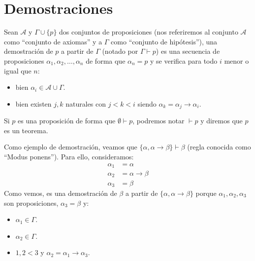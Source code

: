 
\section{Demostraciones}
\begin{definicion}[Demostración]
    Sean $\mathcal{A}$ y $\Gamma\cup\{p\}$ dos conjuntos de proposiciones (nos referiremos al conjunto $\mathcal{A}$ como ``conjunto de axiomas'' y a $\Gamma$ como ``conjunto de hipótesis''), una demostración de $p$ a partir de $\Gamma$ (notado por $\Gamma\vdash p$) es una secuencia de proposiciones $\alpha_1,\alpha_2,\ldots,\alpha_n$ de forma que $\alpha_n=p$ y se verifica para todo $i$ menor o igual que $n$:
    \begin{itemize}
        \item bien $\alpha_i \in \mathcal{A}\cup\Gamma$.
        \item bien existen $j,k$ naturales con $j<k<i$ siendo $\alpha_k = \alpha_j\to \alpha_i$.
    \end{itemize}
\end{definicion}

\begin{notacion}
    Si $p$ es una proposición de forma que $\emptyset \vdash p$, podremos notar $\vdash p$ y diremos que $p$ es un teorema.
\end{notacion}

\begin{ejemplo}
    Como ejemplo de demostración, veamos que $\{\alpha,\alpha\to\beta\}\vdash \beta$ (regla conocida como ``Modus ponens''). Para ello, consideramos:
    \begin{align*}
        \alpha_1 &= \alpha \\
        \alpha_2 &= \alpha\to\beta \\
        \alpha_3 &= \beta
    \end{align*}
    Como vemos, es una demostración de $\beta$ a partir de $\{\alpha,\alpha\to\beta\}$ porque $\alpha_1,\alpha_2,\alpha_3$ son proposiciones, $\alpha_3=\beta$ y:
    \begin{itemize}
        \item $\alpha_1\in \Gamma$.
        \item $\alpha_2\in \Gamma$.
        \item $1,2<3$ y $\alpha_2 = \alpha_1\to \alpha_3$.
    \end{itemize}
\end{ejemplo}

